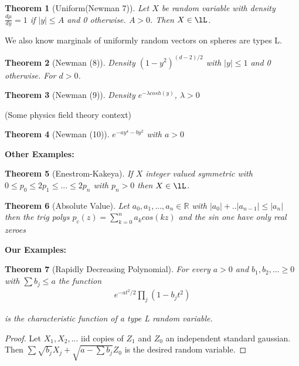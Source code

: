 \documentclass[10pt]{article}
\newcommand{\1}{\textbf{1}}
\newcommand{\R}{\mathbb{R}}
\newtheorem{theorem}{Theorem}
\theoremstyle{remark}
\theoremstyle{definition}
\begin{document}
\begin{theorem}[Uniform(Newman 7)] 
	Let $X$ be random variable with density $\frac{d\mu}{dy} = 1$ if $|y| \leq A$ and 0 otherwise. $A > 0$. Then $X \in \lL$.
\end{theorem}

We also know marginals of uniformly random vectors on spheres are types L.

\begin{theorem}[Newman (8)] 
	Density $(1-y^2)^{(d-2)/2}$ with $|y| \leq 1$ and 0 otherwise. For $d > 0$. 
\end{theorem}

\begin{theorem}[Newman (9)] 
	Density $e^{-\lambda cosh(y)}$, $\lambda >0$
\end{theorem}

(Some physics field theory context)

\begin{theorem}[Newman (10)] 
	$e^{-ay^4-by^2}$ with $a>0$
\end{theorem}

\textbf{Other Examples:}

\begin{theorem}[Enestrom-Kakeya] 
	If $X$ integer valued symmetric with $0\leq p_0 \leq 2 p_1 \leq ... \leq 2p_n$ with $p_n >0$ then $X \in \lL$.
\end{theorem}

\begin{theorem}[Absolute Value] 
	Let $a_0,a_1,...,a_n \in \R$ with $|a_0| + .. | a_{n-1}| \leq |a_n|$ then the trig polys $p_c(z) = \sum_{k=0}^n a_k cos(kz)$ and the sin one have only real zeroes
\end{theorem}

\textbf{Our Examples:}

\begin{theorem}[Rapidly Decreasing Polynomial] For every $a > 0$ and $b_1,b_2,... \geq 0$ with $\sum b_j \leq a$ the function 
\begin{align*}
	e^{-at^2/2} \prod_j (1-b_jt^2)
\end{align*} 

is the characteristic function of a type L random variable.
\end{theorem}

\begin{proof}
	Let $X_1,X_2,...$ iid copies of $Z_1$ and $Z_0$ an independent standard gaussian. Then $\sum \sqrt{b_j} X_j + \sqrt{a - \sum b_j} Z_0$ is the desired random variable.
\end{proof}
\end{document}
